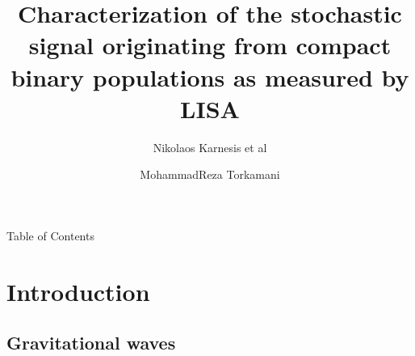 \documentclass[pdf]{beamer}
\title[Stochastic signal originating from CBs mesured by LISA]{Characterization of the stochastic signal originating from compact binary
populations as measured by LISA}
\subtitle{Nikolaos Karnesis et al}
\author{MohammadReza Torkamani}
\begin{document}

\begin{frame}
    \titlepage
\end{frame}

\begin{frame}{Table of Contents}
\vspace*{.1cm}
  \tableofcontents
\end{frame}
\section{Introduction}
\subsection{Gravitational waves}
\end{document}
